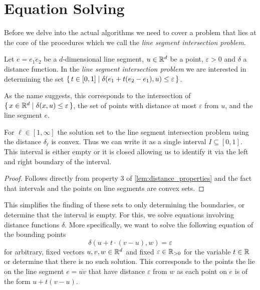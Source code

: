 \section{Equation Solving}
\label{subsec:equation_solving}
Before we delve into the actual algorithms we need to cover a problem that lies at the core of the procedures which we call the \emph{line segment intersection problem}. 
\begin{definition}
  Let \(e = \overline{e_1e_2}\) be a \(d\)-dimensional line segment, \(u \in \mathbb{R}^d\) be a point, \(\varepsilon > 0\) and \(\delta\) a distance function. In the \emph{line segment intersection problem} we are interested in determining the set \(\set{t \in [0, 1] \mid \delta(e_1 + t(e_2 - e_1), u) \leq \varepsilon}\).

  As the name suggests, this corresponds to the intersection of \(\set{x \in \mathbb{R}^d \mid \delta(x, u) \leq \varepsilon}\), the set of points with distance at most \(\varepsilon\) from \(u\), and the line segment \(e\). 
\end{definition}

\begin{observation}
  For \(\ell \in [1, \infty]\) the solution set to the line segment intersection problem using the distance \(\delta_\ell\) is convex. Thus we can write it as a single interval \(I \subseteq [0, 1]\). This interval is either empty or it is closed allowing us to identify it via the left and right boundary of the interval. 
\end{observation}
\begin{proof}
  Follows directly from property 3 of \cref{lem:distance_properties} and the fact that intervals and the points on line segments are convex sets. 
\end{proof}

This simplifies the finding of these sets to only determining the boundaries, or determine that the interval is empty. For this, we solve equations involving distance functions \(\delta\). More specifically, we want to solve the following equation of the bounding points
\begin{equation}
  \delta(u + t \cdot (v - u), w) = \varepsilon \label{eq:eq_solve_main}
\end{equation}
for arbitrary, fixed vectors \(u, v, w \in \mathbb{R}^d\) and fixed \(\varepsilon \in \mathbb{R}_{>0}\) for the variable \(t \in \mathbb{R}\) or determine that there is no such solution. This corresponds to the points the lie on the line segment \(e = \overline{uv}\) that have distance \(\varepsilon\) from \(w\) as each point on \(e\) is of the form \(u + t(v-u)\). 

